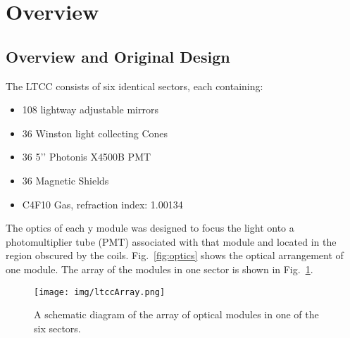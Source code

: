\section{Overview}

\subsection{Overview and Original Design}

The LTCC consists of six identical sectors, each containing:

\begin{itemize}
	\item 108 lightway adjustable mirrors
	\item 36 Winston light collecting Cones
	\item 36 5’’ Photonis X4500B PMT
	\item 36 Magnetic Shields
	\item C4F10 Gas, refraction index: 1.00134
\end{itemize}


The optics of each y module was designed to focus the light onto a photomultiplier tube (PMT) associated with that module and located in the region obscured by the coils.
Fig.~\ref{fig:optics} shows the optical arrangement of one module. The array of the modules in one sector is shown in Fig.~\ref{fig:ltccArray}.

\begin{figure}[hbt]
	\centering
	\texttt{[image: img/ltccArray.png]}
	\caption{A schematic diagram of the array of optical modules in one of the six sectors.}
	\label{fig:ltccArray}
\end{figure}
